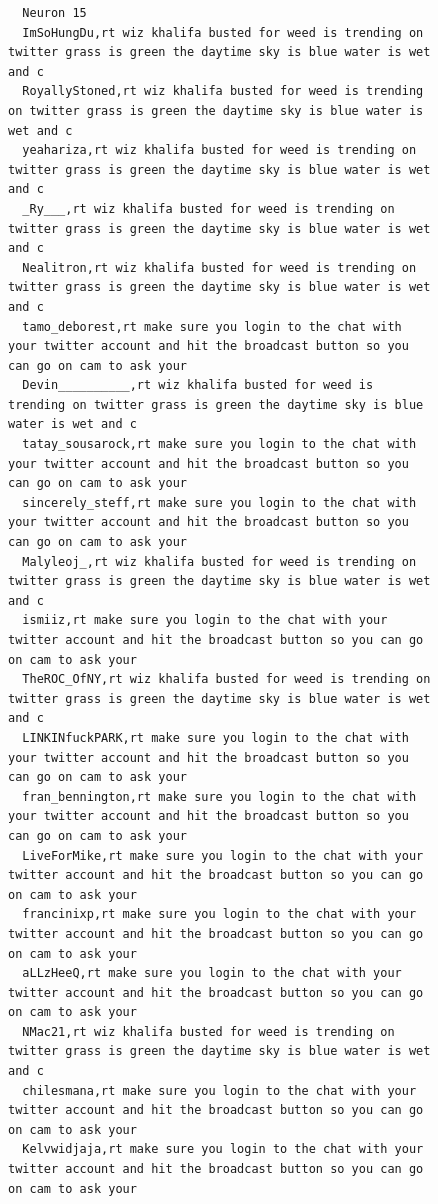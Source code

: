 \begin{figure}[htpb]
\begin{verbatim}
  Neuron 15
  ImSoHungDu,rt wiz khalifa busted for weed is trending on twitter grass is green the daytime sky is blue water is wet and c
  RoyallyStoned,rt wiz khalifa busted for weed is trending on twitter grass is green the daytime sky is blue water is wet and c
  yeahariza,rt wiz khalifa busted for weed is trending on twitter grass is green the daytime sky is blue water is wet and c
  _Ry___,rt wiz khalifa busted for weed is trending on twitter grass is green the daytime sky is blue water is wet and c
  Nealitron,rt wiz khalifa busted for weed is trending on twitter grass is green the daytime sky is blue water is wet and c
  tamo_deborest,rt make sure you login to the chat with your twitter account and hit the broadcast button so you can go on cam to ask your
  Devin__________,rt wiz khalifa busted for weed is trending on twitter grass is green the daytime sky is blue water is wet and c
  tatay_sousarock,rt make sure you login to the chat with your twitter account and hit the broadcast button so you can go on cam to ask your
  sincerely_steff,rt make sure you login to the chat with your twitter account and hit the broadcast button so you can go on cam to ask your
  Malyleoj_,rt wiz khalifa busted for weed is trending on twitter grass is green the daytime sky is blue water is wet and c
  ismiiz,rt make sure you login to the chat with your twitter account and hit the broadcast button so you can go on cam to ask your
  TheROC_OfNY,rt wiz khalifa busted for weed is trending on twitter grass is green the daytime sky is blue water is wet and c
  LINKINfuckPARK,rt make sure you login to the chat with your twitter account and hit the broadcast button so you can go on cam to ask your
  fran_bennington,rt make sure you login to the chat with your twitter account and hit the broadcast button so you can go on cam to ask your
  LiveForMike,rt make sure you login to the chat with your twitter account and hit the broadcast button so you can go on cam to ask your
  francinixp,rt make sure you login to the chat with your twitter account and hit the broadcast button so you can go on cam to ask your
  aLLzHeeQ,rt make sure you login to the chat with your twitter account and hit the broadcast button so you can go on cam to ask your
  NMac21,rt wiz khalifa busted for weed is trending on twitter grass is green the daytime sky is blue water is wet and c
  chilesmana,rt make sure you login to the chat with your twitter account and hit the broadcast button so you can go on cam to ask your
  Kelvwidjaja,rt make sure you login to the chat with your twitter account and hit the broadcast button so you can go on cam to ask your

\end{verbatim}
\end{figure}
